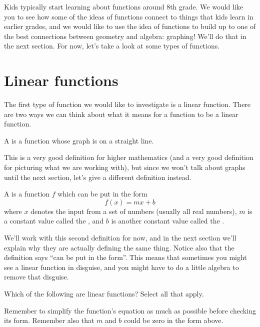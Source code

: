 \documentclass{ximera}
\begin{document}
Kids typically start learning about functions around 8th grade. We would like you to see how some of the ideas of functions connect to things that kids learn in earlier grades, and we would like to use the idea of functions to build up to one of the best connections between geometry and algebra: graphing! We'll do that in the next section. For now, let's take a look at some types of functions.


\section{Linear functions}

The first type of function we would like to investigate is a linear function. There are two ways we can think about what it means for a function to be a linear function.
\begin{definition}
A  is a function whose graph is on a straight line.
\end{definition}
This is a very good definition for higher mathematics (and a very good definition for picturing what we are working with), but since we won't talk about graphs until the next section, let's give a different definition instead.
\begin{definition}
A  is a function $f$ which can be put in the form
\[
f(x) = mx + b
\]
where $x$ denotes the input from a set of numbers (usually all real numbers), $m$ is a constant value called the , and $b$ is another constant value called the .
\end{definition}
We'll work with this second definition for now, and in the next section we'll explain why they are actually defining the same thing. Notice also that the definition says ``can be put in the form''. This means that sometimes you might see a linear function in disguise, and you might have to do a little algebra to remove that disguise.
\begin{question}
Which of the following are linear functions? Select all that apply.
\begin{selectAll}
\end{selectAll}
\begin{feedback}
Remember to simplify the function's equation as much as possible before checking its form. Remember also that $m$ and $b$ could be zero in the form above.
\end{feedback}
\end{question}
\end{document}
